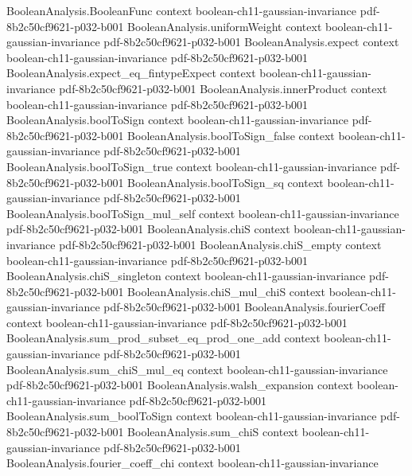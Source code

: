 \begin{lemma}
\proofstep
  {BooleanAnalysis.BooleanFunc}
  {context}
  {boolean-ch11-gaussian-invariance}
  {pdf-8b2c50cf9621-p032-b001}
\proofstep
  {BooleanAnalysis.uniformWeight}
  {context}
  {boolean-ch11-gaussian-invariance}
  {pdf-8b2c50cf9621-p032-b001}
\proofstep
  {BooleanAnalysis.expect}
  {context}
  {boolean-ch11-gaussian-invariance}
  {pdf-8b2c50cf9621-p032-b001}
\proofstep
  {BooleanAnalysis.expect_eq_fintypeExpect}
  {context}
  {boolean-ch11-gaussian-invariance}
  {pdf-8b2c50cf9621-p032-b001}
\proofstep
  {BooleanAnalysis.innerProduct}
  {context}
  {boolean-ch11-gaussian-invariance}
  {pdf-8b2c50cf9621-p032-b001}
\proofstep
  {BooleanAnalysis.boolToSign}
  {context}
  {boolean-ch11-gaussian-invariance}
  {pdf-8b2c50cf9621-p032-b001}
\proofstep
  {BooleanAnalysis.boolToSign_false}
  {context}
  {boolean-ch11-gaussian-invariance}
  {pdf-8b2c50cf9621-p032-b001}
\proofstep
  {BooleanAnalysis.boolToSign_true}
  {context}
  {boolean-ch11-gaussian-invariance}
  {pdf-8b2c50cf9621-p032-b001}
\proofstep
  {BooleanAnalysis.boolToSign_sq}
  {context}
  {boolean-ch11-gaussian-invariance}
  {pdf-8b2c50cf9621-p032-b001}
\proofstep
  {BooleanAnalysis.boolToSign_mul_self}
  {context}
  {boolean-ch11-gaussian-invariance}
  {pdf-8b2c50cf9621-p032-b001}
\proofstep
  {BooleanAnalysis.chiS}
  {context}
  {boolean-ch11-gaussian-invariance}
  {pdf-8b2c50cf9621-p032-b001}
\proofstep
  {BooleanAnalysis.chiS_empty}
  {context}
  {boolean-ch11-gaussian-invariance}
  {pdf-8b2c50cf9621-p032-b001}
\proofstep
  {BooleanAnalysis.chiS_singleton}
  {context}
  {boolean-ch11-gaussian-invariance}
  {pdf-8b2c50cf9621-p032-b001}
\proofstep
  {BooleanAnalysis.chiS_mul_chiS}
  {context}
  {boolean-ch11-gaussian-invariance}
  {pdf-8b2c50cf9621-p032-b001}
\proofstep
  {BooleanAnalysis.fourierCoeff}
  {context}
  {boolean-ch11-gaussian-invariance}
  {pdf-8b2c50cf9621-p032-b001}
\proofstep
  {BooleanAnalysis.sum_prod_subset_eq_prod_one_add}
  {context}
  {boolean-ch11-gaussian-invariance}
  {pdf-8b2c50cf9621-p032-b001}
\proofstep
  {BooleanAnalysis.sum_chiS_mul_eq}
  {context}
  {boolean-ch11-gaussian-invariance}
  {pdf-8b2c50cf9621-p032-b001}
\proofstep
  {BooleanAnalysis.walsh_expansion}
  {context}
  {boolean-ch11-gaussian-invariance}
  {pdf-8b2c50cf9621-p032-b001}
\proofstep
  {BooleanAnalysis.sum_boolToSign}
  {context}
  {boolean-ch11-gaussian-invariance}
  {pdf-8b2c50cf9621-p032-b001}
\proofstep
  {BooleanAnalysis.sum_chiS}
  {context}
  {boolean-ch11-gaussian-invariance}
  {pdf-8b2c50cf9621-p032-b001}
\proofstep
  {BooleanAnalysis.fourier_coeff_chi}
  {context}
  {boolean-ch11-gaussian-invariance}

\end{lemma}
